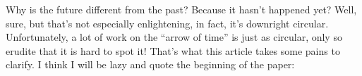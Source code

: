 \documentclass{article}
\def\tightlist{}
\renewcommand{\texttt}[1]{%
  \begingroup
  \ttfamily
  \begingroup\lccode`~=`/\lowercase{\endgroup\def~}{/\discretionary{}{}{}}%
  \begingroup\lccode`~=`[\lowercase{\endgroup\def~}{[\discretionary{}{}{}}%
  \begingroup\lccode`~=`.\lowercase{\endgroup\def~}{.\discretionary{}{}{}}%
  \catcode`/=\active\catcode`[=\active\catcode`.=\active
  \scantokens{#1\noexpand}%
  \endgroup
}
\begin{document}

Why is the future different from the past? Because it hasn't happened
yet? Well, sure, but that's not especially enlightening, in fact, it's
downright circular. Unfortunately, a lot of work on the ``arrow of
time'' is just as circular, only so erudite that it is hard to spot it!
That's what this article takes some pains to clarify. I think I will be
lazy and quote the beginning of the paper:
\end{document}
